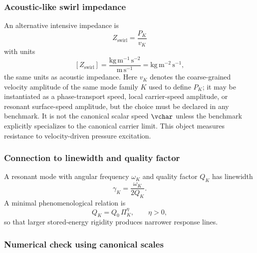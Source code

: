     \subsubsection*{Acoustic-like swirl impedance}
        
        An alternative intensive impedance is
        \begin{equation}
            \boxed{
                Z_{\mathrm{swirl}}
                =
                \frac{P_K}{v_K}
            }
            \label{eq:swirl_acoustic_impedance}
        \end{equation}
        with units
        \[
            [Z_{\mathrm{swirl}}]
            =
            \frac{\mathrm{kg\,m^{-1}\,s^{-2}}}{\mathrm{m\,s^{-1}}}
            =
            \mathrm{kg\,m^{-2}\,s^{-1}},
        \]
        the same units as acoustic impedance. Here $v_K$ denotes the coarse-grained velocity amplitude of the same mode family $K$ used to define $P_K$; it may be instantiated as a phase-transport speed, local carrier-speed amplitude, or resonant surface-speed amplitude, but the choice must be declared in any benchmark. It is not the canonical scalar speed $\vchar$ unless the benchmark explicitly specializes to the canonical carrier limit. This object measures resistance to velocity-driven pressure excitation.
    
    \subsubsection*{Connection to linewidth and quality factor}
        
        A resonant mode with angular frequency \(\omega_K\) and quality factor \(Q_K\) has linewidth
        \begin{equation}
            \gamma_K
            =
            \frac{\omega_K}{2Q_K}.
            \label{eq:linewidth_quality_factor}
        \end{equation}
        A minimal phenomenological relation is
        \begin{equation}
            Q_K
            =
            Q_0\,\Pi_K^\eta,
            \qquad
            \eta>0,
            \label{eq:Q_rigidity_ansatz}
        \end{equation}
        so that larger stored-energy rigidity produces narrower response lines.
    
    \subsubsection*{Numerical check using canonical scales}
        
